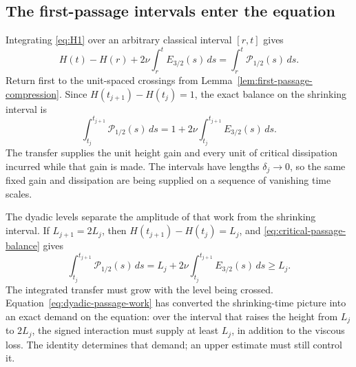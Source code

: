 \subsection{The first-passage intervals enter the equation}

Integrating \eqref{eq:H1} over an arbitrary classical interval \([r,t]\)
gives
\begin{equation}
 H(t)-H(r)
 +2\nu\int_r^tE_{3/2}(s)\,ds
 =\int_r^t\mathcal P_{1/2}(s)\,ds.
 \label{eq:critical-passage-balance}
\end{equation}
Return first to the unit-spaced crossings from
Lemma~\ref{lem:first-passage-compression}.  Since
\(H(t_{j+1})-H(t_j)=1\), the exact balance on the shrinking interval is
\begin{equation}
 \int_{t_j}^{t_{j+1}}\mathcal P_{1/2}(s)\,ds
 =1+2\nu\int_{t_j}^{t_{j+1}}E_{3/2}(s)\,ds.
 \label{eq:unit-passage-work}
\end{equation}
The transfer supplies the unit height gain and every unit of critical
dissipation incurred while that gain is made.  The intervals have lengths
\(\delta_j\to0\), so the same fixed gain and dissipation are being supplied on
a sequence of vanishing time scales.

The dyadic levels separate the amplitude of that work from the shrinking
interval.  If \(L_{j+1}=2L_j\), then
\(H(t_{j+1})-H(t_j)=L_j\), and
\eqref{eq:critical-passage-balance} gives
\begin{equation}
 \int_{t_j}^{t_{j+1}}\mathcal P_{1/2}(s)\,ds
 =L_j+2\nu\int_{t_j}^{t_{j+1}}E_{3/2}(s)\,ds
 \ge L_j.
 \label{eq:dyadic-passage-work}
\end{equation}
The integrated transfer must grow with the level being crossed.
Equation~\eqref{eq:dyadic-passage-work} has converted the shrinking-time
picture into an exact demand on the equation: over the interval that raises
the height from \(L_j\) to \(2L_j\), the signed interaction must supply at
least \(L_j\), in addition to the viscous loss.  The identity determines that
demand; an upper estimate must still control it.


